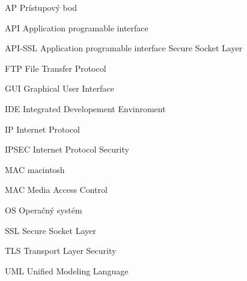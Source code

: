 \begin{seznamzkratek}{90}
	
		{AP}								%
		{Prístupový bod}	
	
		{API}								%
		{Application programable interface}
	
	
		{API-SSL}								%
		{Application programable interface Secure Socket Layer}	
	
		{FTP}								%
		{File Transfer Protocol}		
	
		{GUI}								%
		{Graphical User Interface}	
	
		{IDE}								%
		{Integrated Developement Envinroment}		
	
		{IP}								%
		{Internet Protocol}	
	
		{IPSEC}								%
		{Internet Protocol Security}
	
		{MAC}								%
		{macintosh}
		
		{MAC}								%
		{Media Access Control}	
	
		{OS}								%
		{Operačný systém}		
	
		{SSL}								%
		{Secure Socket Layer}
	
		{TLS}								%
		{Transport Layer Security}	
	
		{UML}								%
		{Unified Modeling Language}

												
\end{seznamzkratek}
